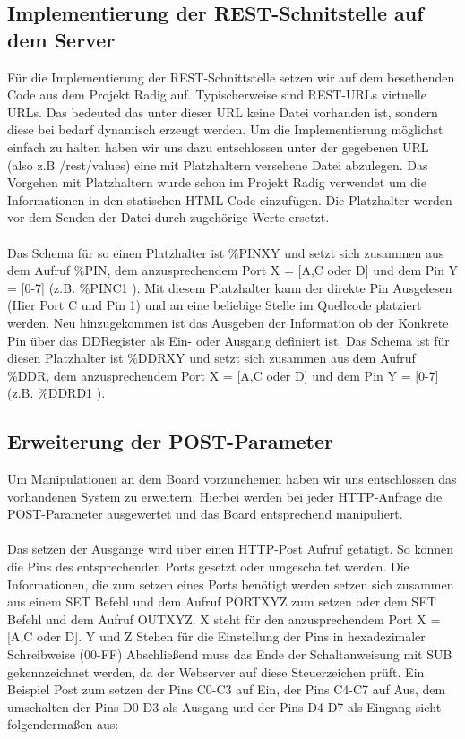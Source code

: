 \subsection{Implementierung der REST-Schnitstelle auf dem Server}
Für die Implementierung der \ac{REST}-Schnittstelle setzen wir auf dem
besethenden Code aus dem Projekt Radig auf. Typischerweise sind
\ac{REST}-\ac{URL}s virtuelle \ac{URL}s.
Das bedeuted das unter dieser \ac{URL} keine Datei vorhanden ist, sondern diese bei
bedarf dynamisch erzeugt werden. Um die Implementierung möglichst einfach zu
halten haben wir uns dazu entschlossen unter der gegebenen \ac{URL} (also z.B  
\textrm{/rest/values}) eine mit Platzhaltern versehene Datei abzulegen. Das
Vorgehen mit Platzhaltern wurde schon im Projekt Radig verwendet um die
Informationen in den statischen \ac{HTML}-Code einzufügen. Die Platzhalter
werden vor dem Senden der Datei durch zugehörige Werte ersetzt.\\
\\
Das Schema für so einen Platzhalter ist \textrm{\%PINXY} und setzt sich zusammen aus dem
Aufruf \textrm{\%PIN}, dem anzusprechendem Port X = [A,C oder D] und dem Pin Y = [0-7] (z.B.
\textrm{\%PINC1 } ). Mit diesem Platzhalter kann der direkte Pin Ausgelesen
(Hier Port C und Pin 1) und an eine beliebige Stelle im Quellcode platziert werden. Neu
hinzugekommen ist das Ausgeben der Information ob der Konkrete Pin über das
DDRegister als Ein- oder Ausgang definiert ist. Das Schema ist für diesen
Platzhalter ist \textrm{\%DDRXY} und setzt sich zusammen aus dem Aufruf \textrm{\%DDR}, dem
anzusprechendem Port X = [A,C oder D] und dem Pin Y = [0-7] (z.B.
\textrm{\%DDRD1} ). 

\subsection{Erweiterung der POST-Parameter}
Um Manipulationen an dem Board vorzunehemen haben wir uns entschlossen das
vorhandenen System zu erweitern. Hierbei werden bei jeder \ac{HTTP}-Anfrage die
POST-Parameter ausgewertet und das Board entsprechend manipuliert.\\
\\
Das setzen der Ausgänge wird über einen HTTP-Post Aufruf getätigt. So können die
Pins des entsprechenden Ports gesetzt oder umgeschaltet werden. Die
Informationen, die zum setzen eines Ports benötigt werden setzen sich zusammen
aus einem \textrm{SET} Befehl und dem Aufruf PORTXYZ zum setzen oder dem
\textrm{SET} Befehl und dem Aufruf OUTXYZ. X steht für den anzusprechendem Port
X = [A,C oder D]. Y und Z Stehen für die Einstellung der Pins in hexadezimaler
Schreibweise (00-FF) Abschließend muss das Ende der Schaltanweisung mit
\textrm{SUB} gekennzeichnet werden, da der Webserver auf diese Steuerzeichen
prüft. Ein Beispiel Post zum setzen der Pins C0-C3 auf Ein, der Pins C4-C7 auf
Aus, dem umschalten der Pins D0-D3 als Ausgang und der Pins D4-D7 als Eingang
sieht folgendermaßen aus:
\\

